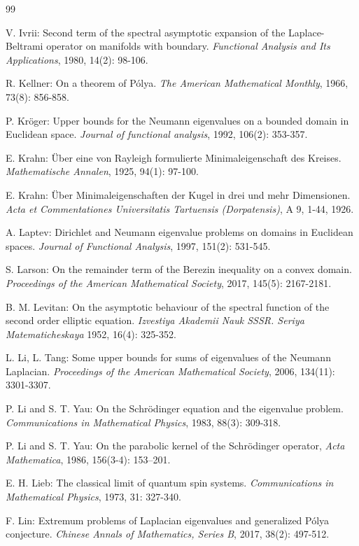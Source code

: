 \documentclass[11pt,letterpaper]{amsart}
\numberwithin{equation}{section}
\theoremstyle{plain}
\theoremstyle{plain}
\numberwithin{equation}{section}
\theoremstyle{remark}
\begin{document}
\begin{thebibliography}{99}
	
	V. Ivrii: Second term of the spectral asymptotic expansion of the Laplace-Beltrami operator on manifolds with boundary. \emph{Functional Analysis and Its Applications}, 1980, 14(2): 98-106.
	
	R. Kellner: On a theorem of P\'olya. \emph{The American Mathematical Monthly}, 1966, 73(8): 856-858.
	
	P. Kr\"oger: Upper bounds for the Neumann eigenvalues on a bounded domain in Euclidean space. \emph{Journal of functional analysis}, 1992, 106(2): 353-357.
	
	E. Krahn: \"Uber eine von Rayleigh formulierte Minimaleigenschaft des Kreises. \emph{Mathematische Annalen}, 1925, 94(1): 97-100.
	
	E. Krahn: \"Uber Minimaleigenschaften der Kugel in drei und mehr Dimensionen. \emph{Acta et Commentationes Universitatis Tartuensis (Dorpatensis)}, A 9, 1-44, 1926.
	
	A. Laptev: Dirichlet and Neumann eigenvalue problems on domains in Euclidean spaces. \emph{Journal of Functional Analysis}, 1997, 151(2): 531-545.
	
	S. Larson: On the remainder term of the Berezin inequality on a convex domain. \emph{Proceedings of the American Mathematical Society}, 2017, 145(5): 2167-2181.
	
	B. M. Levitan: On the asymptotic behaviour of the spectral function of the second order elliptic equation. \emph{Izvestiya Akademii Nauk SSSR. Seriya Matematicheskaya} 1952, 16(4): 325-352.
	
	L. Li, L. Tang: Some upper bounds for sums of eigenvalues of the Neumann Laplacian. \emph{Proceedings of the American Mathematical Society}, 2006, 134(11): 3301-3307.
	
	P. Li and S. T. Yau: On the Schr\"odinger equation and the eigenvalue problem. \emph{Communications in Mathematical Physics}, 1983, 88(3): 309-318.
	
	P. Li and S. T. Yau: On the parabolic kernel of the Schr\"odinger operator, \emph{Acta Mathematica}, 1986, 156(3-4): 153–201.
	
	E. H. Lieb: The classical limit of quantum spin systems. \emph{Communications in Mathematical Physics}, 1973, 31: 327-340.
	
	F. Lin: Extremum problems of Laplacian eigenvalues and generalized P\'olya conjecture. \emph{Chinese Annals of Mathematics, Series B}, 2017, 38(2): 497-512.
	

\end{thebibliography}
\end{document}
